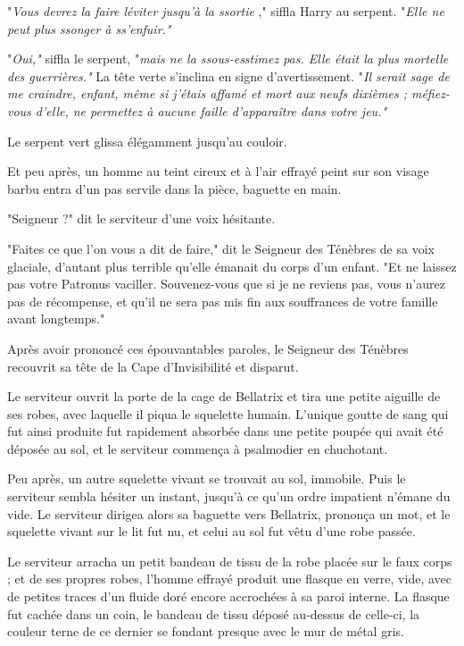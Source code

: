 "\emph{Vous devrez la faire léviter jusqu'à la ssortie} ," siffla Harry au serpent. "\emph{Elle ne peut plus ssonger à ss'enfuir."} 

"\emph{Oui,"}  siffla le serpent, "\emph{mais ne la ssous-esstimez pas. Elle était la plus mortelle des guerrières." } La tête verte s'inclina en signe d'avertissement. "\emph{Il serait sage de me craindre, enfant, même si j'étais affamé et mort aux neufs dixièmes ; méfiez-vous d'elle, ne permettez à aucune faille d'apparaître dans votre jeu."} 

Le serpent vert glissa élégamment jusqu'au couloir.

Et peu après, un homme au teint cireux et à l'air effrayé peint sur son visage barbu entra d'un pas servile dans la pièce, baguette en main.

"Seigneur ?" dit le serviteur d'une voix hésitante.

"Faites ce que l'on vous a dit de faire," dit le Seigneur des Ténèbres de sa voix glaciale, d'autant plus terrible qu'elle émanait du corps d'un enfant. "Et ne laissez pas votre Patronus vaciller. Souvenez-vous que si je ne reviens pas, vous n'aurez pas de récompense, et qu'il ne sera pas mis fin aux souffrances de votre famille avant longtemps."

Après avoir prononcé ces épouvantables paroles, le Seigneur des Ténèbres recouvrit sa tête de la Cape d'Invisibilité et disparut.

Le serviteur ouvrit la porte de la cage de Bellatrix et tira une petite aiguille de ses robes, avec laquelle il piqua le squelette humain. L'unique goutte de sang qui fut ainsi produite fut rapidement absorbée dans une petite poupée qui avait été déposée au sol, et le serviteur commença à psalmodier en chuchotant.

Peu après, un autre squelette vivant se trouvait au sol, immobile. Puis le serviteur sembla hésiter un instant, jusqu'à ce qu'un ordre impatient n'émane du vide. Le serviteur dirigea alors sa baguette vers Bellatrix, prononça un mot, et le squelette vivant sur le lit fut nu, et celui au sol fut vêtu d'une robe passée.

Le serviteur arracha un petit bandeau de tissu de la robe placée sur le faux corps ; et de ses propres robes, l'homme effrayé produit une flasque en verre, vide, avec de petites traces d'un fluide doré encore accrochées à sa paroi interne. La flasque fut cachée dans un coin, le bandeau de tissu déposé au-dessus de celle-ci, la couleur terne de ce dernier se fondant presque avec le mur de métal gris.

